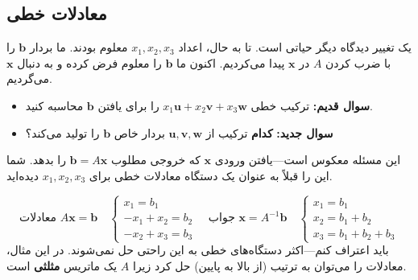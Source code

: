 \documentclass[12pt, a4paper]{book}
\begin{document}
	\subsection*{معادلات خطی}
	یک تغییر دیدگاه دیگر حیاتی است. تا به حال، اعداد $x_1, x_2, x_3$ معلوم بودند. ما بردار $\mathbf{b}$ را با ضرب کردن $A$ در $\mathbf{x}$ پیدا می‌کردیم. اکنون ما $\mathbf{b}$ را معلوم فرض کرده و به دنبال $\mathbf{x}$ می‌گردیم.
	\begin{itemize}
		\item \textbf{سوال قدیم:} ترکیب خطی $x_1\mathbf{u} + x_2\mathbf{v} + x_3\mathbf{w}$ را برای یافتن $\mathbf{b}$ محاسبه کنید.
		\item \textbf{سوال جدید:} \textbf{کدام} ترکیب از $\mathbf{u}, \mathbf{v}, \mathbf{w}$ بردار خاص $\mathbf{b}$ را تولید می‌کند؟
	\end{itemize}
	این مسئله معکوس است—یافتن ورودی $\mathbf{x}$ که خروجی مطلوب $\mathbf{b}=A\mathbf{x}$ را بدهد. شما این را قبلاً به عنوان یک دستگاه معادلات خطی برای $x_1, x_2, x_3$ دیده‌اید.
	
	\[
	\textbf{معادلات } A\mathbf{x}=\mathbf{b} \quad
	\begin{cases}
		x_1 = b_1 \\
		-x_1 + x_2 = b_2 \\
		-x_2 + x_3 = b_3
	\end{cases}
	\quad \textbf{جواب } \mathbf{x} = A^{-1}\mathbf{b} \quad
	\begin{cases}
		x_1 = b_1 \\
		x_2 = b_1 + b_2 \\
		x_3 = b_1 + b_2 + b_3
	\end{cases}
	\]
	باید اعتراف کنم—اکثر دستگاه‌های خطی به این راحتی حل نمی‌شوند. در این مثال، معادلات را می‌توان به ترتیب (از بالا به پایین) حل کرد زیرا $A$ یک ماتریس \textbf{مثلثی} است.
	
\end{document}
